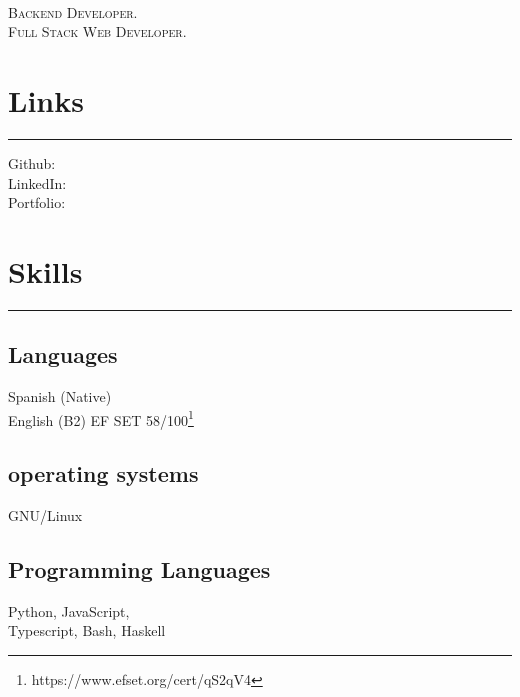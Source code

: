 \documentclass[]{rahulworld-resume}
\begin{document}
%
%

\begin{minipage}[t]{0.33\textwidth}
    \begin{large}
        \\
    \end{large}

    \textsc{Backend Developer.}\\
    \textsc{Full Stack Web Developer.}


    \section{Links}
    \noindent\rule{5cm}{0.4pt}

    Github: \href{https://github.com/jamerrq}{} \\
    LinkedIn: \href{https://www.linkedin.com/in/jamerrq}{} \\
    Portfolio: \href{https://my-portfolio-jamerrq.netlify.app/}{}
    \section{Skills}
    \noindent\rule{5cm}{0.4pt}
    \subsection{Languages}
    Spanish (Native)\\
    English (B2) EF SET 58/100\footnote{https://www.efset.org/cert/qS2qV4}\\
    \vspace{1pt}
    \subsection{operating systems}
    GNU/Linux\\
    \vspace{1pt}
    \subsection{Programming Languages}
    Python, JavaScript,\\
    Typescript, Bash, Haskell\\
    \vspace{1pt}

\end{minipage}
\end{document}
